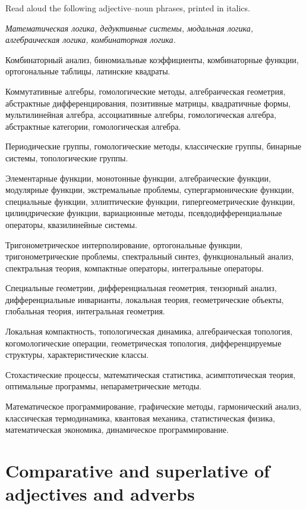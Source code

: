 \begin{keybox}[Exercise 3.5]
Read aloud the following adjective--noun phrases, printed in italics.
\end{keybox}

\begingroup
\cyrillicfont\itshape\small\sloppy
Математическая логика, дедуктивные системы, модальная логика,
алгебраическая логика, комбинаторная логика.

Комбинаторный анализ, биномиальные коэффициенты, комбинаторные
функции, ортогональные таблицы, латинские квадраты.

Коммутативные алгебры, гомологические методы, алгебраическая
геометрия, абстрактные дифференцирования, позитивные матрицы,
квадратичные формы, мультилинейная алгебра, ассоциативные алгебры,
гомологическая алгебра, абстрактные категории, гомологическая алгебра.

Периодические группы, гомологические методы, классические группы,
бинарные системы, топологические группы.

Элементарные функции, монотонные функции, алгебраические функции,
модулярные функции, экстремальные проблемы, супергармонические функции,
специальные функции, эллиптические функции, гипергеометрические
функции, цилиндрические функции, вариационные методы,
псевдодифференциальные операторы, квазилинейные системы.

Тригонометрическое интерполирование, ортогональные функции,
тригонометрические проблемы, спектральный синтез, функциональный анализ,
спектральная теория, компактные операторы, интегральные операторы.

Специальные геометрии, дифференциальная геометрия, тензорный анализ,
дифференциальные инварианты, локальная теория, геометрические объекты,
глобальная теория, интегральная геометрия.

Локальная компактность, топологическая динамика, алгебраическая
топология, когомологические операции, геометрическая топология,
дифференцируемые структуры, характеристические классы.

Стохастические процессы, математическая статистика, асимптотическая
теория, оптимальные программы, непараметрические методы.

Математическое программирование, графические методы, гармонический
анализ, классическая термодинамика, квантовая механика,
статистическая физика, математическая экономика, динамическое
программирование.
\par
\endgroup

\section{Comparative and superlative of adjectives and adverbs}


